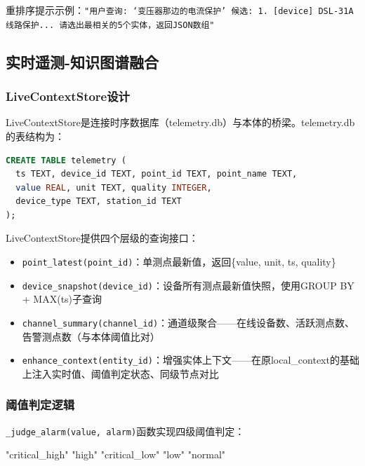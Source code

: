 \documentclass[12pt,a4paper]{article}
\begin{document}
重排序提示示例：\texttt{"用户查询: `变压器那边的电流保护'\ 候选: 1. [device] DSL-31A 线路保护... 请选出最相关的5个实体，返回JSON数组"}

\subsection{实时遥测-知识图谱融合}

\subsubsection{LiveContextStore设计}

LiveContextStore是连接时序数据库（telemetry.db）与本体的桥梁。telemetry.db的表结构为：

\begin{lstlisting}[language=SQL]
CREATE TABLE telemetry (
  ts TEXT, device_id TEXT, point_id TEXT, point_name TEXT,
  value REAL, unit TEXT, quality INTEGER,
  device_type TEXT, station_id TEXT
);
\end{lstlisting}

LiveContextStore提供四个层级的查询接口：
\begin{itemize}
  \item \texttt{point\_latest(point\_id)}：单测点最新值，返回\{value, unit, ts, quality\}
  \item \texttt{device\_snapshot(device\_id)}：设备所有测点最新值快照，使用GROUP BY + MAX(ts)子查询
  \item \texttt{channel\_summary(channel\_id)}：通道级聚合——在线设备数、活跃测点数、告警测点数（与本体阈值比对）
  \item \texttt{enhance\_context(entity\_id)}：增强实体上下文——在原local\_context的基础上注入实时值、阈值判定状态、同级节点对比
\end{itemize}

\subsubsection{阈值判定逻辑}

\texttt{\_judge\_alarm(value, alarm)}函数实现四级阈值判定：

\begin{algorithm}[H]
\caption{阈值判定算法}
\begin{algorithmic}[1]
  \RETURN "critical\_high"
  \RETURN "high"
  \RETURN "critical\_low"
  \RETURN "low"
\ELSE
  \RETURN "normal"
\ENDIF
\end{algorithmic}
\end{algorithm}
\end{document}
